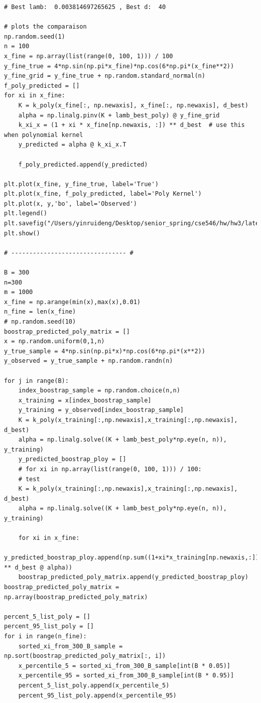 \documentclass{article}
\begin{document}
\begin{verbatim}
# Best lamb:  0.003814697265625 , Best d:  40

# plots the comparaison
np.random.seed(1)
n = 100
x_fine = np.array(list(range(0, 100, 1))) / 100
y_fine_true = 4*np.sin(np.pi*x_fine)*np.cos(6*np.pi*(x_fine**2))
y_fine_grid = y_fine_true + np.random.standard_normal(n)
f_poly_predicted = []
for xi in x_fine:
	K = k_poly(x_fine[:, np.newaxis], x_fine[:, np.newaxis], d_best)
	alpha = np.linalg.pinv(K + lamb_best_poly) @ y_fine_grid
	k_xi_x = (1 + xi * x_fine[np.newaxis, :]) ** d_best  # use this when polynomial kernel
	y_predicted = alpha @ k_xi_x.T
	
	f_poly_predicted.append(y_predicted)

plt.plot(x_fine, y_fine_true, label='True')
plt.plot(x_fine, f_poly_predicted, label='Poly Kernel')
plt.plot(x, y,'bo', label='Observed')
plt.legend()
plt.savefig("/Users/yinruideng/Desktop/senior_spring/cse546/hw/hw3/latex/plots/A3d_1_test.png")
plt.show()

# -------------------------------- #

B = 300
n=300
m = 1000
x_fine = np.arange(min(x),max(x),0.01)
n_fine = len(x_fine)
# np.random.seed(10)
boostrap_predicted_poly_matrix = []
x = np.random.uniform(0,1,n)
y_true_sample = 4*np.sin(np.pi*x)*np.cos(6*np.pi*(x**2))
y_observed = y_true_sample + np.random.randn(n)

for j in range(B):
	index_boostrap_sample = np.random.choice(n,n)
	x_training = x[index_boostrap_sample]
	y_training = y_observed[index_boostrap_sample]
	K = k_poly(x_training[:,np.newaxis],x_training[:,np.newaxis], d_best)
	alpha = np.linalg.solve((K + lamb_best_poly*np.eye(n, n)), y_training)
	y_predicted_boostrap_ploy = []
	# for xi in np.array(list(range(0, 100, 1))) / 100:
	# test
	K = k_poly(x_training[:,np.newaxis],x_training[:,np.newaxis], d_best)
	alpha = np.linalg.solve((K + lamb_best_poly*np.eye(n, n)), y_training)
	
	for xi in x_fine:
		y_predicted_boostrap_ploy.append(np.sum((1+xi*x_training[np.newaxis,:]) ** d_best @ alpha))
	boostrap_predicted_poly_matrix.append(y_predicted_boostrap_ploy)
boostrap_predicted_poly_matrix = np.array(boostrap_predicted_poly_matrix)

percent_5_list_poly = []
percent_95_list_poly = []
for i in range(n_fine):
	sorted_xi_from_300_B_sample = np.sort(boostrap_predicted_poly_matrix[:, i])
	x_percentile_5 = sorted_xi_from_300_B_sample[int(B * 0.05)]
	x_percentile_95 = sorted_xi_from_300_B_sample[int(B * 0.95)]
	percent_5_list_poly.append(x_percentile_5)
	percent_95_list_poly.append(x_percentile_95)


\end{verbatim}
\end{document}
